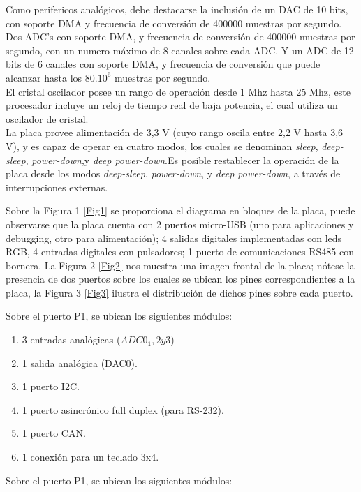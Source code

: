 \documentclass[12pt,letterpaper]{article}
\begin{document}
Como perifericos analógicos, debe destacarse la inclusión de un DAC de 10 bits, con soporte DMA y frecuencia de conversión de 400000 muestras por segundo. Dos ADC's con soporte DMA, y frecuencia de conversión de 400000 muestras por segundo, con un numero máximo de 8 canales sobre cada ADC. Y un ADC de 12 bits de 6 canales con soporte DMA, y frecuencia de conversión que puede alcanzar hasta los $80 . 10^6$ muestras por segundo.\\
El cristal oscilador posee un rango de operación desde 1 Mhz hasta 25 Mhz, este procesador incluye un reloj de tiempo real de baja potencia, el cual utiliza un oscilador de cristal.\\
La placa provee alimentación de 3,3 V (cuyo rango oscila entre 2,2 V hasta 3,6 V), y es capaz de operar en cuatro modos, los cuales se denominan \textit{sleep}, \textit{deep-sleep}, \textit{power-down},y \textit{deep power-down}.Es posible restablecer la operación de la placa desde los modos \textit{deep-sleep}, \textit{power-down}, y \textit{deep power-down}, a través de interrupciones externas.


Sobre la Figura 1 \ref{Fig1} se proporciona el diagrama en bloques de la placa, puede observarse que la placa cuenta con 2 puertos micro-USB (uno para aplicaciones y debugging, otro para alimentación); 4 salidas digitales implementadas con leds RGB, 4 entradas digitales con pulsadores; 1 puerto de comunicaciones RS485 con bornera. La Figura 2 \ref{Fig2} nos muestra  una imagen frontal de la placa; nótese la presencia de dos puertos sobre los cuales se ubican los pines correspondientes a la placa, la Figura 3 \ref{Fig3} ilustra el distribución de dichos pines sobre cada puerto.


Sobre el puerto P1, se ubican los siguientes módulos:

\begin{enumerate}
\item 3 entradas analógicas ($ADC0_ 1,2 y 3$)
\item 1 salida analógica (DAC0).
\item 1 puerto I2C.
\item 1 puerto asincrónico full duplex (para RS-232).
\item 1 puerto CAN.
\item 1 conexión para un teclado 3x4.
\end{enumerate}

Sobre el puerto P1, se ubican los siguientes módulos:
\end{document}
